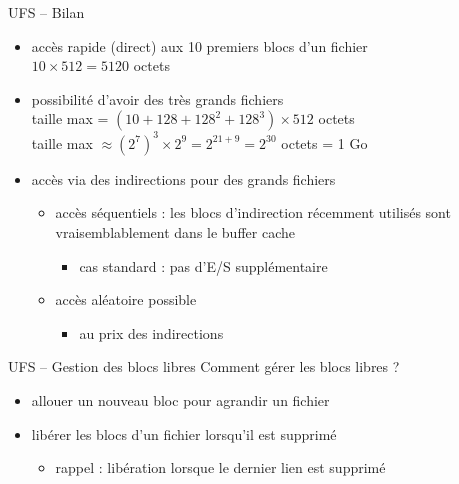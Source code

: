 \begin {frame} {UFS -- Bilan}

    \begin {itemize}
	\item accès rapide (direct) aux 10 premiers blocs d'un fichier
	    \\
	    $10 \times 512 = 5120$ octets
	\item possibilité d'avoir des très grands fichiers
	    \\
	    taille max = $(10 + 128 + 128^2 + 128^3) \times 512$ octets
	    \\
	    taille max $\approx (2^7)^3 \times 2^9 = 2^{21+9} = 2^{30}$
		octets = 1 Go

	\item accès via des indirections pour des grands fichiers
	    \begin {itemize}
		\item accès séquentiels : les blocs d'indirection
		    récemment utilisés sont vraisemblablement dans le
		    buffer cache
		    \begin {itemize}
			\item cas standard : pas d'E/S supplémentaire
		    \end {itemize}

		\item accès aléatoire possible
		    \begin {itemize}
			\item au prix des indirections
		    \end {itemize}

	    \end {itemize}
    \end {itemize}
\end {frame}

\begin {frame} {UFS -- Gestion des blocs libres}
    Comment gérer les blocs libres ?

    \begin {itemize}
	\item allouer un nouveau bloc pour agrandir un fichier
	\item libérer les blocs d'un fichier lorsqu'il est supprimé
	    \begin {itemize}
		\item rappel : libération lorsque le dernier lien est supprimé
	    \end {itemize}
    \end {itemize}
\end {frame}

